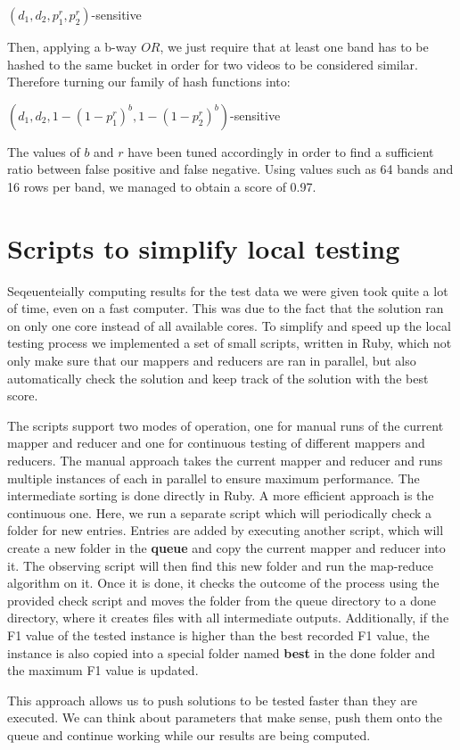 \documentclass[a4paper, 11pt]{article}
\begin{document}
\vspace{8pt}
\begin{center}
	$(d_{1},d_{2},p_{1}^r,p_{2}^r)$-sensitive
\end{center}
\vspace{8pt}
Then, applying a b-way $OR$, we just require that at least one band has to be hashed to the same bucket in order for two videos to be considered similar. Therefore turning our family of hash functions into:
\vspace{8pt}
\begin{center}
	$(d_{1},d_{2},1-(1-p_{1}^r)^b,1-(1-p_{2}^r)^b)$-sensitive
\end{center}
\vspace{8pt}
The values of $b$ and $r$ have been tuned accordingly in order to find a sufficient ratio between false positive and false negative. Using values such as 64 bands and 16 rows per band, we managed to obtain a score of 0.97.

\section*{Scripts to simplify local testing}
Seqeuenteially computing results for the test data we were given took quite a lot of time, even on a fast
computer. This was due to the fact that the solution ran on only one core instead of all available cores.
To simplify and speed up the local testing process we implemented a set of small scripts, written in Ruby,
which not only make sure that our mappers and reducers are ran in parallel, but also automatically check
the solution and keep track of the solution with the best score.
\vspace{8pt}

The scripts support two modes of operation, one for manual runs of the current mapper and reducer and one
for continuous testing of different mappers and reducers. The manual approach takes the current mapper and
reducer and runs multiple instances of each in parallel to ensure maximum performance. The intermediate 
sorting is done directly in Ruby. A more efficient approach is the continuous one. Here, we run a separate
script which will periodically check a folder for new entries. Entries are added by executing another script,
which will create a new folder in the \textbf{queue} and copy the current mapper and reducer into it. The observing script will then find this new folder and run the map-reduce algorithm on it. Once it is done, it checks the outcome of the process using the provided check script and moves the folder from the queue directory to a done directory, where it creates files with all intermediate outputs. Additionally, if the F1 value of the tested instance is higher than the best recorded F1 value, the instance is also copied into a special folder named \textbf{best} in the done folder and the maximum F1 value is updated.
\vspace{8pt}

This approach allows us to push solutions to be tested faster than they are executed. We can think
about parameters that make sense, push them onto the queue and continue working while our results are
being computed.
\end{document}
